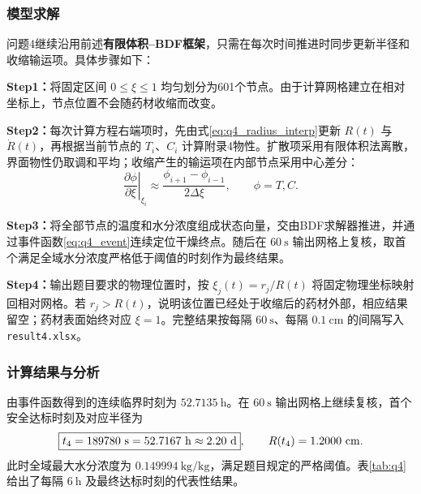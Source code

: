\documentclass[12pt,a4paper,fontset=none]{ctexart}
\begin{document}
\subsubsection{模型求解}
问题4继续沿用前述\textbf{有限体积--BDF框架}，只需在每次时间推进时同步更新半径和收缩输运项。具体步骤如下：

\noindent\textbf{Step1：}将固定区间 $0\le\xi\le1$ 均匀划分为601个节点。由于计算网格建立在相对坐标上，节点位置不会随药材收缩而改变。

\noindent\textbf{Step2：}每次计算方程右端项时，先由式\eqref{eq:q4_radius_interp}更新 $R(t)$ 与 $\dot R(t)$，再根据当前节点的 $T_i$、$C_i$ 计算附录4物性。扩散项采用有限体积法离散，界面物性仍取调和平均；收缩产生的输运项在内部节点采用中心差分：
\begin{equation}
\left.\frac{\partial\phi}{\partial\xi}\right|_{\xi_i}
\approx\frac{\phi_{i+1}-\phi_{i-1}}{2\Delta\xi},
\qquad \phi=T,C.
\label{eq:q4_geometry_discrete}
\end{equation}

\noindent\textbf{Step3：}将全部节点的温度和水分浓度组成状态向量，交由BDF求解器推进，并通过事件函数\eqref{eq:q4_event}连续定位干燥终点。随后在 $60\ \mathrm s$ 输出网格上复核，取首个满足全域水分浓度严格低于阈值的时刻作为最终结果。

\noindent\textbf{Step4：}输出题目要求的物理位置时，按 $\xi_j(t)=r_j/R(t)$ 将固定物理坐标映射回相对网格。若 $r_j>R(t)$，说明该位置已经处于收缩后的药材外部，相应结果留空；药材表面始终对应 $\xi=1$。完整结果按每隔 $60\ \mathrm s$、每隔 $0.1\ \mathrm{cm}$ 的间隔写入 \texttt{result4.xlsx}。

\subsubsection{计算结果与分析}
由事件函数得到的连续临界时刻为 $52.7135\ \mathrm h$。在 $60\ \mathrm s$ 输出网格上继续复核，首个安全达标时刻及对应半径为
\begin{equation}
\boxed{t_4=189780\ \mathrm{s}=\QFourDryHours\ \mathrm{h}\approx2.20\ \mathrm{d}},
\qquad R(t_4)=\QFourDryRadius\ \mathrm{cm}.
\end{equation}
此时全域最大水分浓度为 $0.149994\ \mathrm{kg/kg}$，满足题目规定的严格阈值。表\ref{tab:q4}给出了每隔 $6\ \mathrm h$ 及最终达标时刻的代表性结果。
\end{document}
